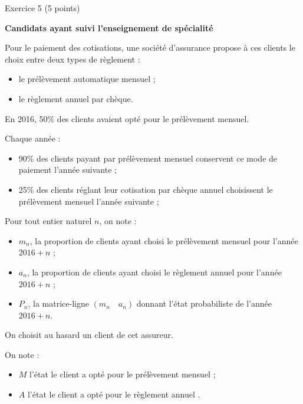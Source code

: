 
%
\begin{h2}Exercice 5 (5 points)\end{h2}
\par
\textbf{Candidats ayant suivi l'enseignement de spécialité}
\par
Pour le paiement des cotisations, une société d'assurance propose à ces clients le choix entre deux types de règlement :
\par
\begin{itemize}
     \item
     le prélèvement automatique mensuel ;
     \item
     le règlement annuel par chèque.
\end{itemize}
\par
En 2016, 50\% des clients avaient opté pour le prélèvement mensuel.
\par
Chaque année :
\begin{itemize}
     \item
     90\% des clients payant par prélèvement mensuel conservent ce mode de paiement l'année suivante ;
     \item
     25\% des clients réglant leur cotisation par chèque annuel choisissent le prélèvement mensuel l'année suivante ;
\end{itemize}
\par
Pour tout entier naturel $n$, on note :
\begin{itemize}
     \item
     $m_{n}$, la proportion de clients ayant choisi le prélèvement mensuel pour l'année $2016 + n$ ;
     \item
     $a_{n}$, la proportion de clients ayant choisi le règlement annuel pour l'année $2016 + n$ ;
     \item
     $P_{n}$, la matrice-ligne $\left(m_{n} \quad a_{n}\right)$ donnant l'état probabiliste de l'année $2016 + n$.
\end{itemize}
\par
On choisit au hasard un client de cet assureur.
\par
On note :
\begin{itemize}
     \item %
     $M$ l'état \og le client a opté pour le prélèvement mensuel \fg{} ;
     \item %
     $A$ l'état \og le client a opté pour le règlement annuel \fg{} .
\end{itemize}
